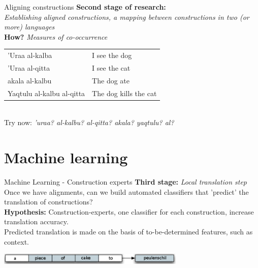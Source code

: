 \documentclass[compress]{beamer}
\begin{document}
\begin{frame}[fragile]
	\begin{block}{Aligning constructions}
		\textbf{Second  stage of research:}  \\
			\emph{Establishing aligned constructions, a mapping between constructions in two (or more) languages} \\		

		\textbf{How?} \emph{Measures of co-occurrence} \\
	\end{block}

	\begin{example}	
		\begin{tabular}{|l|l|}
			\hline
			'Uraa al-kalba & I see the dog			\\
			'Uraa al-qitta & I see the cat			\\
			akala al-kalbu & The dog ate				 \\
			Yaqtulu al-kalbu al-qitta &  The dog kills the cat \\
			\hline
		\end{tabular} \\
		Try now: \emph{'uraa? al-kalbu? al-qitta? akala? yaqtulu? al? }
	\end{example}
\end{frame}

\section{Machine learning}

\begin{frame}
	\begin{block}{Machine Learning - Construction experts}
		\textbf{Third stage:} \emph{Local translation step} \\

		Once we have alignments, can we build automated classifiers that 'predict' the translation of constructions? \\
		\textbf{Hypothesis:} Construction-experts, one classifier for each construction, increase translation accuracy. \\ %
		\smallskip
		Predicted translation is made on the basis of to-be-determined features, such as context.
	\end{block}

	\begin{center}
		 \includegraphics[width=90.0mm]{presinstance2.png} \\		
	\end{center}
\end{frame}
\end{document}
